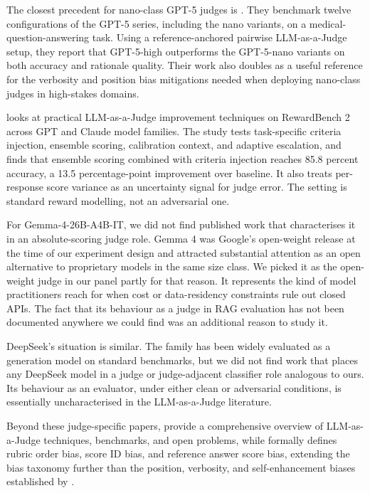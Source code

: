 The closest precedent for nano-class GPT-5 judges is \citet{antaki2025gpt5}. They benchmark twelve configurations of the GPT-5 series, including the nano variants, on a medical-question-answering task. Using a reference-anchored pairwise LLM-as-a-Judge setup, they report that GPT-5-high outperforms the GPT-5-nano variants on both accuracy and rationale quality. Their work also doubles as a useful reference for the verbosity and position bias mitigations needed when deploying nano-class judges in high-stakes domains.

\citet{lail2026empirical} looks at practical LLM-as-a-Judge improvement techniques on RewardBench 2 across GPT and Claude model families. The study tests task-specific criteria injection, ensemble scoring, calibration context, and adaptive escalation, and finds that ensemble scoring combined with criteria injection reaches 85.8 percent accuracy, a 13.5 percentage-point improvement over baseline. It also treats per-response score variance as an uncertainty signal for judge error. The setting is standard reward modelling, not an adversarial one.

For Gemma-4-26B-A4B-IT, we did not find published work that characterises it in an absolute-scoring judge role. Gemma 4 was Google's open-weight release at the time of our experiment design and attracted substantial attention as an open alternative to proprietary models in the same size class. We picked it as the open-weight judge in our panel partly for that reason. It represents the kind of model practitioners reach for when cost or data-residency constraints rule out closed APIs. The fact that its behaviour as a judge in RAG evaluation has not been documented anywhere we could find was an additional reason to study it.

DeepSeek's situation is similar. The family has been widely evaluated as a generation model on standard benchmarks, but we did not find work that places any DeepSeek model in a judge or judge-adjacent classifier role analogous to ours. Its behaviour as an evaluator, under either clean or adversarial conditions, is essentially uncharacterised in the LLM-as-a-Judge literature.

Beyond these judge-specific papers, \citet{li2024llms} provide a comprehensive overview of LLM-as-a-Judge techniques, benchmarks, and open problems, while \citet{li2025scoring} formally defines rubric order bias, score ID bias, and reference answer score bias, extending the bias taxonomy further than the position, verbosity, and self-enhancement biases established by \citet{zheng2023judging}.

